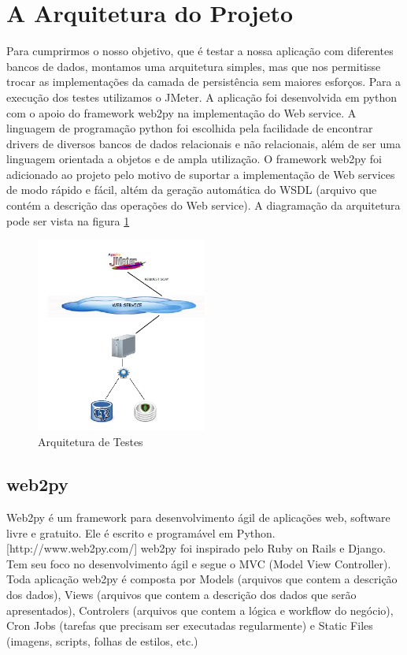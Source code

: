\section{A Arquitetura do Projeto}

Para cumprirmos o nosso objetivo, que é testar a nossa aplicação com diferentes bancos de dados, montamos uma arquitetura simples, mas que nos permitisse trocar as implementações da camada de persistência sem maiores esforços. Para a execução dos testes utilizamos o JMeter. A aplicação foi desenvolvida em python com o apoio do framework web2py na implementação do Web service. A linguagem de programação python foi escolhida pela facilidade de encontrar drivers de diversos bancos de dados relacionais e não relacionais, além de ser uma linguagem orientada a objetos e de ampla utilização. O framework web2py foi adicionado ao projeto pelo motivo de suportar a implementação de Web services de modo rápido e fácil, altém da geração automática do WSDL (arquivo que contém a descrição das operações do Web service). A diagramação da arquitetura pode ser vista na figura \ref{fig:arquitetura}

	\begin{figure}[!htbp]
		\begin{center}
			\includegraphics[width=0.5\textwidth]{arquitetura}
		\end{center}
		\caption{Arquitetura de Testes}
		\label{fig:arquitetura}
	\end{figure}

\subsection{web2py}

Web2py é um framework para desenvolvimento ágil de aplicações web, software livre e gratuito. Ele é escrito e programável em Python. [http://www.web2py.com/] web2py foi inspirado pelo Ruby on Rails e Django. Tem seu foco no desenvolvimento ágil e segue o MVC (Model View Controller). Toda aplicação web2py é composta por Models (arquivos que contem a descrição dos dados), Views (arquivos que contem a descrição dos dados que serão apresentados), Controlers (arquivos que contem a lógica e workflow do negócio), Cron Jobs (tarefas que precisam ser executadas regularmente) e Static Files (imagens, scripts, folhas de estilos, etc.)

